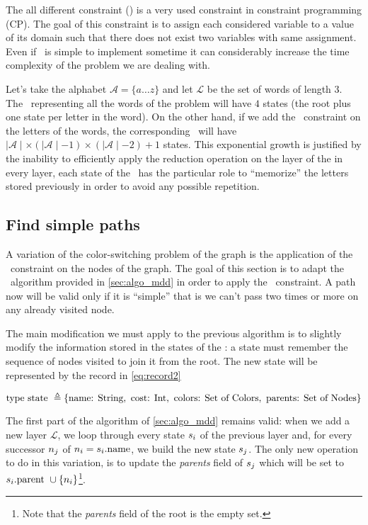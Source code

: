 The all different constraint (\alldiff) is a very used constraint in constraint programming (CP). The goal of this constraint is to assign each considered variable to a value of its domain such that there does not exist two variables with same assignment. Even if \alldiff\ is simple to implement sometime it can considerably increase the time complexity of the problem we are dealing with.

Let's take the alphabet $\mathcal{A} = \{a \dots z\}$ and let $\mathcal{L}$ be the set of words of length $3$. The \mdd\ representing all the words of the problem will have $4$ states (the root plus one state per letter in the word). On the other hand, if we add the \alldiff\ constraint on the letters of the words, the corresponding \mdd\ will have $\mid \mathcal{A} \mid \times (\mid \mathcal{A} \mid - 1) \times (\mid \mathcal{A} \mid - 2) + 1$ states. This exponential growth is justified by the inability to efficiently apply the reduction operation on the layer of the \mdd\: in every layer, each state of the \mdd\ has the particular role to ``memorize'' the letters stored previously in order to avoid any possible repetition.

\subsection{Find simple paths}

A variation of the color-switching problem of the graph is the application of the \alldiff\ constraint on the nodes of the graph. The goal of this section is to adapt the \mdd\ algorithm provided in \cref{sec:algo_mdd} in order to apply the \alldiff\ constraint. A path now will be valid only if it is ``simple'' that is we can't pass two times or more on any already visited node.

The main modification we must apply to the previous algorithm is to slightly modify the information stored in the states of the \mdd: a state must remember the sequence of nodes visited to join it from the root. The new state will be represented by the record in \cref{eq:record2}

\begin{equation}
  \label{eq:record2}
  \text{type state } \triangleq \{\text{name: } \text{String}, \text{ cost: } \text{Int}, \text{ colors: } \text{Set of Colors}, \text{ parents: } \text{Set of Nodes} \}
\end{equation}

The first part of the algorithm of \cref{sec:algo_mdd} remains valid: when we add a new layer $\mathcal{L}$, we loop through every state $s_i$ of the previous layer and, for every successor $n_j$ of $n_i = s_i\text{.name}$, we build the new state $s_j$. The only new operation to do in this variation, is to update the \textit{parents} field of $s_j$ which will be set to $s_i\text{.parent } \cup \{n_i\}$\footnote{Note that the \textit{parents} field of the root is the empty set.}.

